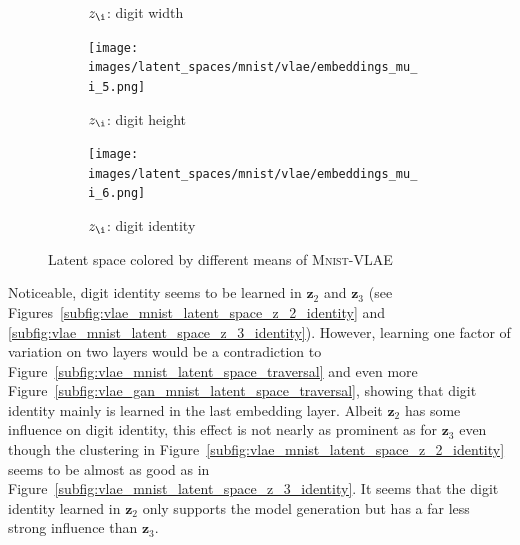 \begin{landscape}
\begin{figure}
{\begin{adjustbox}{valign=T}
\begin{subfigure}{.19\textwidth}
                \caption{$z_{\i}$: digit width}
                \label{subfig:vlae_mnist_latent_space_z_\i_width}
            \end{subfigure}
        \end{adjustbox}
        \hfill
        \begin{adjustbox}{valign=T}
            \begin{subfigure}{.19\textwidth}
                \texttt{[image: images/latent\_spaces/mnist/vlae/embeddings\_mu\_\\i\_5.png]}
                \caption{$z_{\i}$: digit height}
                \label{subfig:vlae_mnist_latent_space_z_\i_height}
            \end{subfigure}
        \end{adjustbox}
        \hfill
        \begin{adjustbox}{valign=T}
            \begin{subfigure}{.19\textwidth}
                \texttt{[image: images/latent\_spaces/mnist/vlae/embeddings\_mu\_\\i\_6.png]}
                \caption{$z_{\i}$: digit identity}
                \label{subfig:vlae_mnist_latent_space_z_\i_identity}
            \end{subfigure}
        \end{adjustbox}}
        \caption[\textsc{Mnist}-VLAE Latent Space]{Latent space colored by different means of \textsc{Mnist}-\ac{VLAE}}
        \label{fig:vlae_latent_space_mnist}
    \end{figure}
\end{landscape}

Noticeable, digit identity seems to be learned in $\bm{z}_2$ and $\bm{z}_3$ (see Figures~\ref{subfig:vlae_mnist_latent_space_z_2_identity} and \ref{subfig:vlae_mnist_latent_space_z_3_identity}).
However, learning one factor of variation on two layers would be a contradiction to Figure~\ref{subfig:vlae_mnist_latent_space_traversal} and even more Figure~\ref{subfig:vlae_gan_mnist_latent_space_traversal}, showing that digit identity mainly is learned in the last embedding layer.
Albeit $\bm{z}_2$ has some influence on digit identity, this effect is not nearly as prominent as for $\bm{z}_3$ even though the clustering in Figure~\ref{subfig:vlae_mnist_latent_space_z_2_identity} seems to be almost as good as in Figure~\ref{subfig:vlae_mnist_latent_space_z_3_identity}.
It seems that the digit identity learned in $\bm{z}_2$ only supports the model generation but has a far less strong influence than $\bm{z}_3$.


